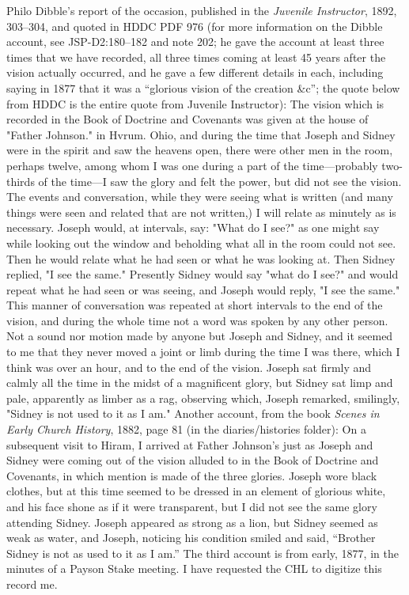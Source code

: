 		Philo Dibble's report of the occasion, published in the \textit{Juvenile Instructor}, 1892, 303--304, and quoted in HDDC PDF 976 (for more information on the Dibble account, see JSP-D2:180--182 and note 202; he gave the account at least three times that we have recorded, all three times coming at least 45 years after the vision actually occurred, and he gave a few different details in each, including saying in 1877 that it was a ``glorious vision of the creation \&c''; the quote below from HDDC is the entire quote from Juvenile Instructor):
			The vision which is recorded in the Book of Doctrine and Covenants was given at the house of "Father Johnson." in Hvrum. Ohio, and during the time that Joseph and Sidney were in the spirit and saw the heavens open, there were other men in the room, perhaps twelve, among whom I was one during a part of the time---probably two-thirds of the time---I saw the glory and felt the power, but did not see the vision.
			The events and conversation, while they were seeing what is written (and many things were seen and related that are not written,) I will relate as minutely as is necessary.
			Joseph would, at intervals, say: "What do I see?" as one might say while looking out the window and beholding what all in the room could not see. Then he would relate what he had seen or what he was looking at. Then Sidney replied, "I see the same." Presently Sidney would say "what do I see?" and would repeat what he had seen or was seeing, and Joseph would reply, "I see the same."
			This manner of conversation was repeated at short intervals to the end of the vision, and during the whole time not a word was spoken by any other person.
			Not a sound nor motion made by anyone but Joseph and Sidney, and it seemed to me that they never moved a joint or limb during the time I was there, which I think was over an hour, and to the end of the vision.
			Joseph sat firmly and calmly all the time in the midst of a magnificent glory, but Sidney sat limp and pale, apparently as limber as a rag, observing which, Joseph remarked, smilingly, "Sidney is not used to it as I am."
		Another account, from the book \textit{Scenes in Early Church History}, 1882, page 81 (in the diaries/histories folder):
			On a subsequent visit to Hiram, I arrived at Father Johnson's just as Joseph and Sidney were coming out of the vision alluded to in the Book of Doctrine and Covenants, in which mention is made of the three glories. Joseph wore black clothes, but at this time seemed to be dressed in an element of glorious white, and his face shone as if it were transparent, but I did not see the same glory attending Sidney. Joseph appeared as strong as a lion, but Sidney seemed as weak as water, and Joseph, noticing his condition smiled and said, ``Brother Sidney is not as used to it as I am.''
		The third account is from early, 1877, in the minutes of a Payson Stake meeting. I have requested the CHL to digitize this record me.
			
